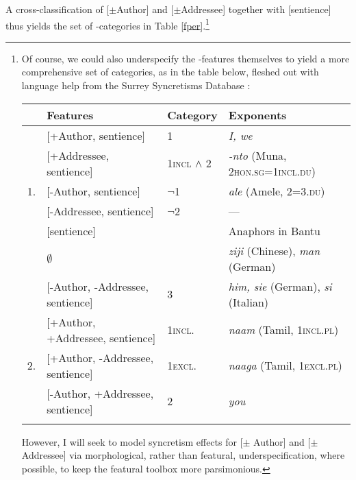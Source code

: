 \documentclass[output=paper, modfonts, nonflat]{langsci/langscibook}
\begin{document}
A cross-classification of [$\pm$Author] and [$\pm$Addressee] together
with [sentience] thus yields the set of \person-categories in Table
\ref{fper}.\footnote{Of course, we could also underspecify the
  \person-features themselves to yield a more comprehensive set of
  categories, as in the table below, fleshed out with language help
  from the Surrey Syncretisms Database \citep{surrey:2002}:

      \begin{tabular}{llll}
      \lsptoprule
      & \textbf{Features} & \textbf{Category} & \textbf{Exponents}\\  
      \midrule
   &   {[+Author, sentience]} & \textsc{1} & \textit{I, we}\\
    &   {[+Addressee, sentience]} & \textsc{1incl} $\wedge$ \textsc{2} & \textit{-nto} (Muna, \textsc{2hon.sg=1incl.du})\\   
   1. &  {[-Author, sentience]} & \textsc{$\neg$1} & \textit{ale} (Amele, \textsc{2=3.du})\\
        &   {[-Addressee, sentience]} & \textsc{$\neg$2} & ---\\
        & {[sentience]} & {} & Anaphors in Bantu\\
        &   $\emptyset$ & \nul{} & \textit{ziji} (Chinese),
                                     \textit{man} (German)\\
\midrule
  &     {[-Author, -Addressee, sentience]} & \textsc{3} & \textit{him,
                                                       sie} (German), \textit{si} (Italian)\\
     &  {[+Author, +Addressee, sentience]} & \textsc{1incl.} & \textit{naam}
                                                  (Tamil, \textsc{1incl.pl})\\
   2. &   {[+Author, -Addressee, sentience]} &  \textsc{1excl.} &
                                                   \textit{naa\textipa{\ng}ga\Y}
                                                   (Tamil, \textsc{1excl.pl})\\
        &   {[-Author, +Addressee, sentience]} & 2 & \textit{you}\\
          \lspbottomrule
      \end{tabular}
      
      However, I will seek to model syncretism effects for [$\pm$
      Author] and [$\pm$Addressee] via morphological, rather than
      featural, underspecification, where possible, to keep the
      featural toolbox more parsimonious.}
\end{document}
